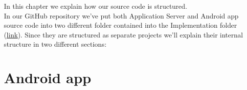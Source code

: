 In this chapter we explain how our source code is structured. \\
In our GitHub repository we've put both Application Server and Android app source code into two different folder contained into the Implementation folder (\href{https://github.com/JustSalva/MelziPinaSalvadore/tree/master/Implementation}{\color{blue}link}). 
Since they are structured as separate projects we'll explain their internal structure in two different sections:
\section{Android app}
\begin{figure}[H]
\end{figure}

